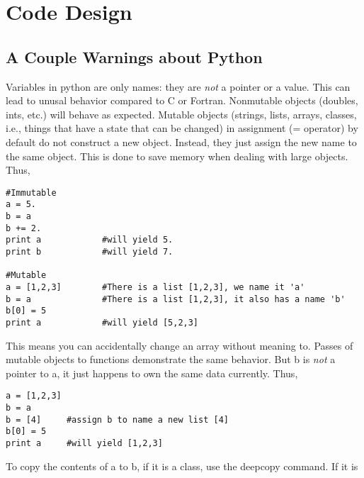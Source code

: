 \documentclass[preprint,12pt]{elsarticle}
\begin{document}
\section{Code Design}

\subsection{A Couple Warnings about Python}
Variables in python are only names: they are \emph{not} a pointer
or a value. This can lead to unusal behavior compared to C or Fortran.
Nonmutable objects (doubles, ints, etc.) will behave as expected. Mutable
objects (strings, lists, arrays, classes, i.e., things that have a state that can be
changed) in assignment (= operator) by default do not
construct a new object. Instead, they just assign the new name to the same object.
This is done to save memory when dealing with large objects.   Thus, 
\begin{lstlisting}
#Immutable
a = 5.
b = a
b += 2.
print a            #will yield 5.
print b            #will yield 7.     

#Mutable
a = [1,2,3]        #There is a list [1,2,3], we name it 'a'
b = a              #There is a list [1,2,3], it also has a name 'b'
b[0] = 5 
print a            #will yield [5,2,3]
\end{lstlisting}
This means you can accidentally change an array without meaning
to. Passes of mutable
objects to functions demonstrate the same behavior.  But b is \emph{not} a pointer to a, it just happens to own the same data
currently. Thus,
\begin{lstlisting}
a = [1,2,3]
b = a
b = [4]     #assign b to name a new list [4]
b[0] = 5
print a     #will yield [1,2,3]
\end{lstlisting}
To copy the contents of a to b, if it is a class, use the deepcopy command.  If it is
\end{document}
